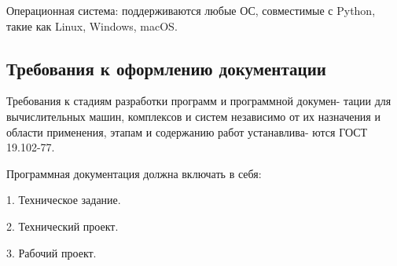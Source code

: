 Операционная система: поддерживаются любые ОС, совместимые с Python, такие как Linux, Windows, macOS.
\subsection{Требования к оформлению документации}
Требования к стадиям разработки программ и программной докумен- тации для вычислительных машин, комплексов и систем независимо от их назначения и области применения, этапам и содержанию работ устанавлива- ются ГОСТ 19.102-77.

Программная документация должна включать в себя:

1.	Техническое задание.

2.	Технический проект.

3.	Рабочий проект.

